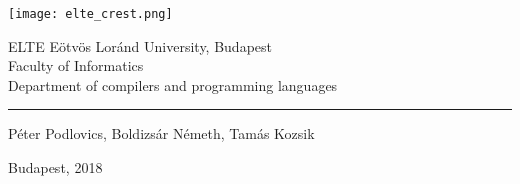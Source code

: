 \documentclass[main.tex]{subfiles}
\begin{document}
	\newcommand{\DEPARTMENT}[0]{Department of compilers and programming languages}
	
	\begin{titlepage}
		
		\begin{minipage}{0.4\linewidth}
			\texttt{[image: elte\_crest.png]}
		\end{minipage}
		\begin{minipage}{0.6\linewidth}
			\begin{center}
				\large
				ELTE Eötvös Loránd University, Budapest \\
				Faculty of Informatics \\
				\DEPARTMENT
			\end{center}
		\end{minipage}
		
		\hrule
		\vfill
		
		\begin{center}
			\Huge
			\makeatletter
			\textbf{\@title}
			\makeatother
			\normalsize
		\end{center}
		
		\hspace{3cm}
		
		\begin{center}
			\LARGE
			Péter Podlovics, Boldizsár Németh, Tamás Kozsik
		\end{center}
		
		\vfill
		
		\begin{center}
			\large
			Budapest, 2018
		\end{center}
		
	\end{titlepage}
	
\end{document}

